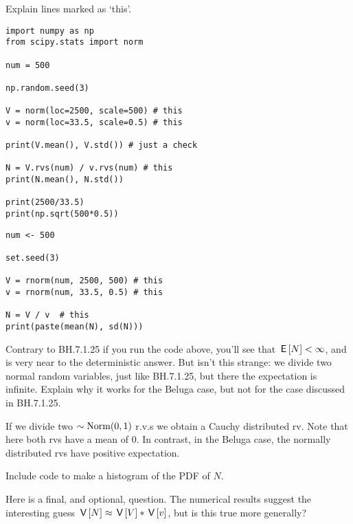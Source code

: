 \begin{exercise}
Explain lines marked as `this'.

\begin{verbatim}
import numpy as np
from scipy.stats import norm

num = 500

np.random.seed(3)

V = norm(loc=2500, scale=500) # this
v = norm(loc=33.5, scale=0.5) # this

print(V.mean(), V.std()) # just a check

N = V.rvs(num) / v.rvs(num) # this
print(N.mean(), N.std())

print(2500/33.5)
print(np.sqrt(500*0.5))
\end{verbatim}

\begin{verbatim}
num <- 500

set.seed(3)

V = rnorm(num, 2500, 500) # this
v = rnorm(num, 33.5, 0.5) # this

N = V / v  # this
print(paste(mean(N), sd(N)))

\end{verbatim}
\end{exercise}


\begin{exercise}
Contrary to BH.7.1.25 if you run the code above, you'll see that $\,\mathsf{E}\left[N\right] < \infty$, and is very near to the deterministic answer.
But isn't this strange: we divide two normal random variables, just like BH.7.1.25, but there the expectation is infinite.
Explain why it works for the Beluga case, but not for the case discussed in BH.7.1.25.
\begin{solution}
If we divide two $\sim \mathrm{Norm}(0,1)$ r.v.s we obtain a Cauchy distributed rv.
Note that here both rvs have a mean of $0$.
In contrast, in the Beluga case, the normally distributed rvs have positive expectation.
\end{solution}
\end{exercise}

\begin{exercise}
Include code to make a histogram of the PDF of $N$.
\end{exercise}



\begin{remark}
Here is a final, and optional, question. The numerical results suggest the interesting guess $\,\mathsf{V}\left[N\right] \approx \,\mathsf{V}\left[V\right] * \,\mathsf{V}\left[v\right]$, but is this true more generally?
\end{remark}
